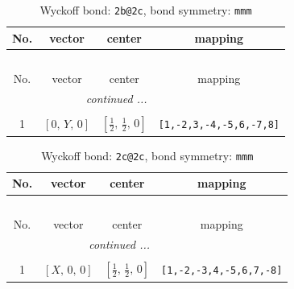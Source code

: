 \documentclass[fleqn,8pt]{jsarticle}
\begin{document}
\renewcommand{\arraystretch}{1.2}
\begin{longtable}{cccc}
\caption{Wyckoff bond: {\tt 2b@2c}, bond symmetry: {\tt mmm}}
 \\
 \hline \hline
No. & vector & center & mapping \\ \hline \endfirsthead

\multicolumn{3}{l}{\tablename\ \thetable{}} \\
 \hline \hline
No. & vector & center & mapping \\ \hline \endhead

 \hline \hline
\multicolumn{3}{r}{\footnotesize\it continued ...} \\ \endfoot

 \hline \hline
\multicolumn{3}{r}{} \\ \endlastfoot

1 & $\left[ 0,\, Y,\, 0 \right]$ & $\left[ \frac{1}{2},\, \frac{1}{2},\, 0 \right]$ & {\tt [1,-2,3,-4,-5,6,-7,8]} \\
\end{longtable}
\renewcommand{\arraystretch}{1.2}
\begin{longtable}{cccc}
\caption{Wyckoff bond: {\tt 2c@2c}, bond symmetry: {\tt mmm}}
 \\
 \hline \hline
No. & vector & center & mapping \\ \hline \endfirsthead

\multicolumn{3}{l}{\tablename\ \thetable{}} \\
 \hline \hline
No. & vector & center & mapping \\ \hline \endhead

 \hline \hline
\multicolumn{3}{r}{\footnotesize\it continued ...} \\ \endfoot

 \hline \hline
\multicolumn{3}{r}{} \\ \endlastfoot

1 & $\left[ X,\, 0,\, 0 \right]$ & $\left[ \frac{1}{2},\, \frac{1}{2},\, 0 \right]$ & {\tt [1,-2,-3,4,-5,6,7,-8]} \\
\end{longtable}
\renewcommand{\arraystretch}{1.2}
\end{document}
